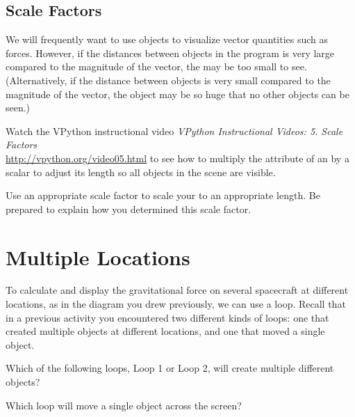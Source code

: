 \documentclass[10pt]{article}
\begin{document}
\subsection{Scale Factors}

We will frequently want to use  objects to visualize vector quantities such as forces.  However, if the distances between objects in the program is very large compared to the magnitude of the vector, the  may be too small to see.  (Alternatively, if the distance between objects is very small compared to the magnitude of the vector, the  object may be so huge that no other objects can be seen.)\\

\begin{compactitem}[\color{MIRed}$\Rightarrow$]
\item Watch the VPython instructional video \textit{VPython Instructional Videos: 5. Scale Factors }\\ \url{http://vpython.org/video05.html} to see how to multiply the  attribute of an  by a scalar to adjust its length so all objects in the scene are visible.
\item Use an appropriate scale factor to scale your  to an appropriate length.  Be prepared to explain how you determined this scale factor.\\
\end{compactitem}

\checkpoint

\section{Multiple Locations}

To calculate and display the gravitational force on several spacecraft at different locations, as in the diagram you drew previously, we can use a loop.  Recall that in a previous activity you encountered two different kinds of loops:  one that created multiple objects at different locations, and one that moved a single object.\\ 

\begin{compactitem}[\color{MIRed}$\Rightarrow$]
\item Which of the following loops, Loop 1 or Loop 2, will create multiple different objects? 
\item Which loop will move a single object across the screen?\\
\end{compactitem}
\end{document}
